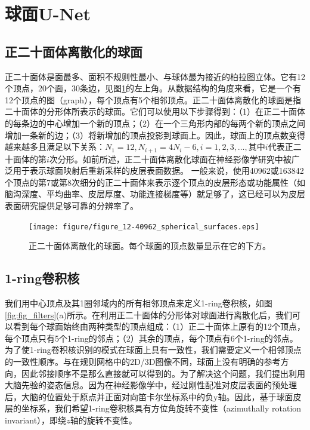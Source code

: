 \section{球面U-Net}\label{sec:球面U-Net}
\subsection{正二十面体离散化的球面}\label{sec:正二十面体离散化的球面}
正二十面体是面最多、面积不规则性最小、与球体最为接近的柏拉图立体\cite{PlatonicSolid}。它有12个顶点，20个面，30条边，见图\ref{fig:figure_12-40962_spherical_surfaces}的左上角。从数据结构的角度来看，它是一个有12个顶点的图（graph），每个顶点有5个相邻顶点。正二十面体离散化的球面是指二十面体的分形体所表示的球面。它们可以使用以下步骤得到：（1）在正二十面体的每条边的中心增加一个新的顶点；（2）在一个三角形内部的每两个新的顶点之间增加一条新的边；（3）将新增加的顶点投影到球面上。因此，球面上的顶点数变得越来越多且满足以下关系：$N_1=12,N_{i+1}=4N_i-6,i=1,2,3,\dots,$其中$i$代表正二十面体的第$i$次分形。如前所述，正二十面体离散化球面在神经影像学研究中被广泛用于表示球面映射后重新采样的皮层表面数据\cite{fischl2012freesurfer}。
一般来说，使用40962或163842个顶点的第7或第8次细分的正二十面体来表示逐个顶点的皮层形态或功能属性（如脑沟深度、平均曲率、皮层厚度、功能连接梯度等）就足够了，这已经可以为皮层表面研究提供足够可靠的分辨率了。

\begin{figure}[t]
    \centering
    \texttt{[image: figure/figure\_12-40962\_spherical\_surfaces.eps]}
    \caption{\label{fig:figure_12-40962_spherical_surfaces}正二十面体离散化的球面。每个球面的顶点数量显示在它的下方。}
\end{figure}


\subsection{1-ring卷积核}\label{sec:1-ring卷积核}
我们用中心顶点及其1圈邻域内的所有相邻顶点来定义1-ring卷积核，如图\ref{fig:fig_filters}(a)所示。在利用正二十面体的分形体对球面进行离散化后，我们可以看到每个球面始终由两种类型的顶点组成：（1）正二十面体上原有的12个顶点，每个顶点只有5个1-ring的邻点；（2）其余的顶点，每个顶点有6个1-ring的邻点。为了使1-ring卷积核识别的模式在球面上具有一致性，我们需要定义一个相邻顶点的一致性顺序。与在规则网格中的2D/3D图像不同，球面上没有明确的参考方向，因此邻接顺序不是那么直接就可以得到的。为了解决这个问题，我们提出利用大脑先验的姿态信息。因为在神经影像学中，经过刚性配准\cite{greve2009accurate}对皮层表面的预处理后，大脑的位置处于原点并正面对向笛卡尔坐标系中的负y轴。因此，基于球面皮层的坐标系，我们希望1-ring卷积核具有方位角旋转不变性（azimuthally rotation invariant），即绕$z$轴的旋转不变性。

